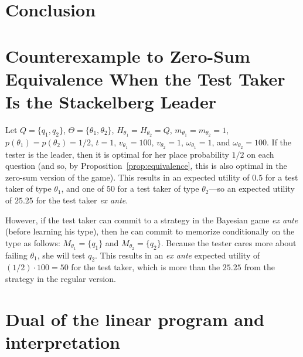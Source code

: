 \documentclass{article}
\begin{document}
\section{Conclusion}



\appendix

\section{Counterexample to Zero-Sum Equivalence When the Test Taker Is the
  Stackelberg Leader}
\label{se:counterexample}

Let $Q=\{q_1,q_2\}$, $\Theta=\{\theta_1,\theta_2\}$,
$H_{\theta_1}=H_{\theta_2}=Q$, $m_{\theta_1}=m_{\theta_2}=1$,
$p(\theta_1)=p(\theta_2)=1/2$, $t=1$, $v_{\theta_1} = 100$, $v_{\theta_2} =
1$, $\omega_{\theta_1} = 1$, and $\omega_{\theta_2} = 100$.  If the tester
is the leader, then it is optimal for her place probability $1/2$ on each
question (and so, by Proposition~\ref{prop:equivalence}, this is also
optimal in the zero-sum version of the game).  This results in an expected
utility of $0.5$ for a test taker of type $\theta_1$, and one of $50$ for a
test taker of type $\theta_2$---so an expected utility of $25.25$ for the
test taker {\em ex ante}.

However, if the test taker can commit to a strategy in the Bayesian game
{\em ex ante} (before learning his type), then he can commit to
memorize conditionally on the type as follows: $M_{\theta_1} =\{q_1\}$ and 
$M_{\theta_2} =\{q_2\}$.  Because the tester cares more about failing
$\theta_1$, she will test $q_2$.  This results in an {\em ex ante} expected
utility of $(1/2) \cdot 100 = 50$ for the test taker, which is more than
the $25.25$ from the strategy in the regular version.













\section{Dual of the linear program and interpretation}




\end{document}
